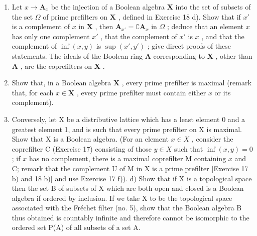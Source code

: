 \begin{enumerate}
\def\labelenumi{\alph{enumi})}
\item
  Let \(x \to \mathbf{A}_x\) be the injection of a Boolean algebra \(\mathbf{X}\) into the set of subsets of the set \(\Omega\) of prime prefilters on \(\mathbf{X}\) , defined in Exercise 18 d). Show that if \(x'\) is a complement of \(x\) in \(\mathbf{X}\) , then \(\mathbf{A}_{x'} = \complement \mathbf{A}_x\) in \(\Omega\) ; deduce that an element \(x\) has only one complement \(x'\) , that the complement of \(x'\) is \(x\) , and that the complement of \(\inf (x, y)\) is \(\sup (x', y')\) ; give direct proofs of these statements. The ideals of the Boolean ring \(\mathbf{A}\) corresponding to \(\mathbf{X}\) , other than \(\mathbf{A}\) , are the coprefilters on \(\mathbf{X}\) .
\item
  Show that, in a Boolean algebra \(\mathbf{X}\) , every prime prefilter is maximal (remark that, for each \(x \in \mathbf{X}\) , every prime prefilter must contain either \(x\) or its complement).
\item
  Conversely, let X be a distributive lattice which has a least element 0 and a greatest element 1, and is such that every prime prefilter on X is maximal. Show that X is a Boolean algebra. (For an element \(x \in X\) , consider the coprefilter C (Exercise 17) consisting of those \(y \in X\) such that \(\inf(x, y) = 0\) ; if \(x\) has no complement, there is a maximal coprefilter M containing \(x\) and C; remark that the complement U of M in X is a prime prefilter {[}Exercise 17 b) and 18 b){]} and use Exercise 17 f)). d) Show that if X is a topological space then the set B of subsets of X which are both open and closed is a Boolean algebra if ordered by inclusion. If we take X to be the topological space associated with the Fréchet filter (no. 5), show that the Boolean algebra B thus obtained is countably infinite and therefore cannot be isomorphic to the ordered set P(A) of all subsets of a set A.
\end{enumerate}
